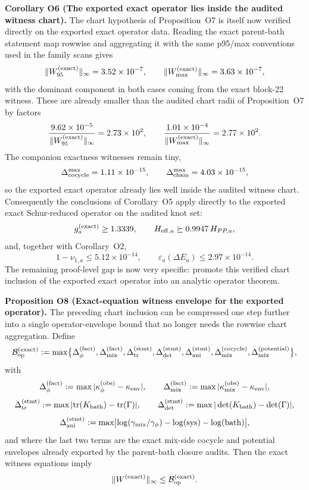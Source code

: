 \documentclass[aps,prd,onecolumn,notitlepage,nofootinbib,superscriptaddress,11pt,floatfix]{revtex4-2}
\begin{document}
\medskip\noindent\textbf{Corollary O6 (The exported exact operator lies inside the audited witness chart).}
The chart hypothesis of Proposition~O7 is itself now verified directly on the exported exact operator data. Reading the exact parent-bath statement map rowwise and aggregating it with the same p95/max conventions used in the family scans gives
\[
\|W_{95}^{\rm(exact)}\|_\infty = 3.52\times10^{-7},
\qquad
\|W_{\max}^{\rm(exact)}\|_\infty = 3.63\times10^{-7},
\]
with the dominant component in both cases coming from the exact block-22 witness. These are already smaller than the audited chart radii of Proposition~O7 by factors
\[
\frac{9.62\times10^{-5}}{\|W_{95}^{\rm(exact)}\|_\infty}=2.73\times10^{2},
\qquad
\frac{1.01\times10^{-4}}{\|W_{\max}^{\rm(exact)}\|_\infty}=2.77\times10^{2}.
\]
The companion exactness witnesses remain tiny,
\[
\Delta_{\rm cocycle}^{\max}=1.11\times10^{-15},
\qquad
\Delta_{\rm chain}^{\max}=4.03\times10^{-15},
\]
so the exported exact operator already lies well inside the audited witness chart. Consequently the conclusions of Corollary~O5 apply directly to the exported exact Schur-reduced operator on the audited knot set:
\[
g_a^{\rm(exact)}\ge 1.3339,
\qquad
H_{{\rm eff},a}\succeq 0.9947\,H_{PP,a},
\]
and, together with Corollary~O2,
\[
1-\nu_{1,a}\le 5.12\times10^{-14},
\qquad
\varepsilon_a(\Delta E_a)\le 2.97\times10^{-14}.
\]
The remaining proof-level gap is now very specific: promote this verified chart inclusion of the exported exact operator into an analytic operator theorem.

\medskip\noindent\textbf{Proposition O8 (Exact-equation witness envelope for the exported operator).}
The preceding chart inclusion can be compressed one step further into a single operator-envelope bound that no longer needs the rowwise chart aggregation. Define
\[
\mathcal B_{\rm op}^{\rm(exact)}:=
\max\bigl\{
\Delta_{\phi}^{\rm(fact)},
\Delta_{\rm mix}^{\rm(fact)},
\Delta_{\rm tr}^{\rm(stmt)},
\Delta_{\rm det}^{\rm(stmt)},
\Delta_{\rm ani}^{\rm(stmt)},
\Delta_{\rm mix}^{\rm(cocycle)},
\Delta_{\rm mix}^{\rm(potential)}
\bigr\},
\]
with
\[
\Delta_{\phi}^{\rm(fact)}:=\max|\kappa_{\phi}^{\rm(obs)}-\kappa_{\rm env}|,
\qquad
\Delta_{\rm mix}^{\rm(fact)}:=\max|\kappa_{\rm mix}^{\rm(obs)}-\kappa_{\rm env}|,
\]
\[
\Delta_{\rm tr}^{\rm(stmt)}:=\max|{\rm tr}(K_{\rm bath})-{\rm tr}(\Gamma)|,
\qquad
\Delta_{\rm det}^{\rm(stmt)}:=\max|\det(K_{\rm bath})-\det(\Gamma)|,
\]
\[
\Delta_{\rm ani}^{\rm(stmt)}:=\max\bigl|\log(\gamma_{\rm mix}/\gamma_{\phi})-\log({\rm sys})-\log({\rm bath})\bigr|,
\]
and where the last two terms are the exact mix-side cocycle and potential envelopes already exported by the parent-bath closure audits. Then the exact witness equations imply
\[
\|W^{\rm(exact)}\|_\infty \le \mathcal B_{\rm op}^{\rm(exact)}.
\]
\end{document}

